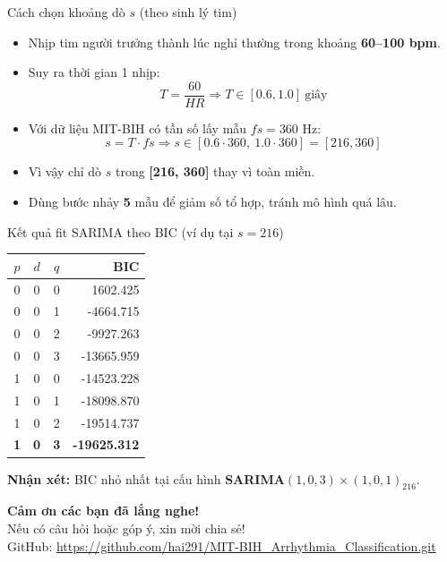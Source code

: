 \documentclass{beamer}
\begin{document}
\begin{frame}{Cách chọn khoảng dò $s$ (theo sinh lý tim)}
    \begin{itemize}
        \item Nhịp tim người trưởng thành lúc nghỉ thường trong khoảng \textbf{60--100 bpm}.
        \item Suy ra thời gian 1 nhịp:
        \[
            T = \frac{60}{HR} \Rightarrow T \in [0.6, 1.0]\ \text{giây}
        \]
        \item Với dữ liệu MIT-BIH có tần số lấy mẫu $fs=360$ Hz:
        \[
            s = T\cdot fs \Rightarrow s \in [0.6\cdot 360,\ 1.0\cdot 360] = [216, 360]
        \]
        \item Vì vậy chỉ dò $s$ trong \textbf{[216, 360]} thay vì toàn miền.
        \item Dùng bước nhảy \textbf{5} mẫu để giảm số tổ hợp, tránh mô hình quá lâu.
    \end{itemize}
\end{frame}

\begin{frame}{Kết quả fit SARIMA theo BIC (ví dụ tại $s=216$)}
    \scriptsize
    \begin{table}[]
        \centering
        \begin{tabular}{ccc|r}
        \toprule
        $p$ & $d$ & $q$ & BIC \\
        \midrule
        0 & 0 & 0 & 1602.425 \\
        0 & 0 & 1 & -4664.715 \\
        0 & 0 & 2 & -9927.263 \\
        0 & 0 & 3 & -13665.959 \\
        1 & 0 & 0 & -14523.228 \\
        1 & 0 & 1 & -18098.870 \\
        1 & 0 & 2 & -19514.737 \\
        \textbf{1} & \textbf{0} & \textbf{3} & \textbf{-19625.312} \\
        \bottomrule
        \end{tabular}
    \end{table}
    \vspace{0.2cm}
    \normalsize
    \textbf{Nhận xét:} BIC nhỏ nhất tại cấu hình \textbf{SARIMA$(1,0,3)\times(1,0,1)_{216}$}.
\end{frame}

\begin{frame}
    \begin{center}
        \Huge \textbf{Cảm ơn các bạn đã lắng nghe!} \\
        \vspace{0.5cm}
        \large Nếu có câu hỏi hoặc góp ý, xin mời chia sẻ! \\
        \vspace{0.5cm}
        \normalsize GitHub: \url{https://github.com/hai291/MIT-BIH_Arrhythmia_Classification.git}
    \end{center}
\end{frame}
\end{document}
